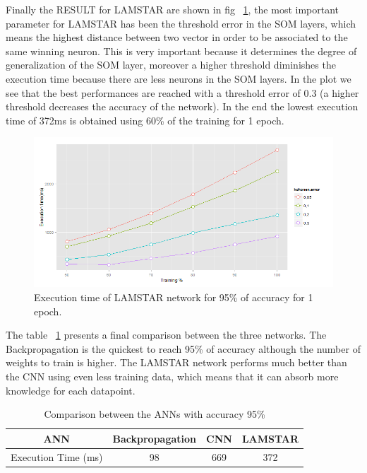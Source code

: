 \documentclass[a4paper, 10pt, conference]{ieeeconf}      %
\begin{document}
Finally the RESULT for LAMSTAR are shown in fig ~\ref{lamstarPlot}, the most important parameter for LAMSTAR has been the threshold error in the SOM layers, which means the highest distance between two vector in order to be associated to the same winning neuron. This is very important because it determines the degree of generalization of the SOM layer, moreover a higher threshold diminishes the execution time because there are less neurons in the SOM layers.
In the plot we see that the best performances are reached with a threshold error of 0.3 (a higher threshold decreases the accuracy of the network). In the end the lowest execution time of 372ms is obtained using 60\% of the training for 1 epoch.
\begin{figure}[thpb]
	
	\includegraphics[scale=0.3]{plotLamstar2.png}
	\caption{Execution time of LAMSTAR network for 95\% of accuracy for 1 epoch.}
	\label{lamstarPlot}
\end{figure}

The table ~\ref{comp} presents a final comparison between the three networks. The Backpropagation is the quickest to reach 95\% of accuracy although the number of weights to train is higher. The LAMSTAR network performs much better than the CNN using even less training data, which means that it can absorb more knowledge for each datapoint.
\begin{table}[]
	\centering
	\caption{Comparison between the ANNs with accuracy 95\%}
	\label{comp}
	\begin{tabular}{|c|c|c|c|}
		\hline
		ANN                 & Backpropagation & CNN & LAMSTAR \\ \hline
		Execution Time (ms) & 98              & 669 & 372     \\ \hline
	\end{tabular}
\end{table}
\end{document}
